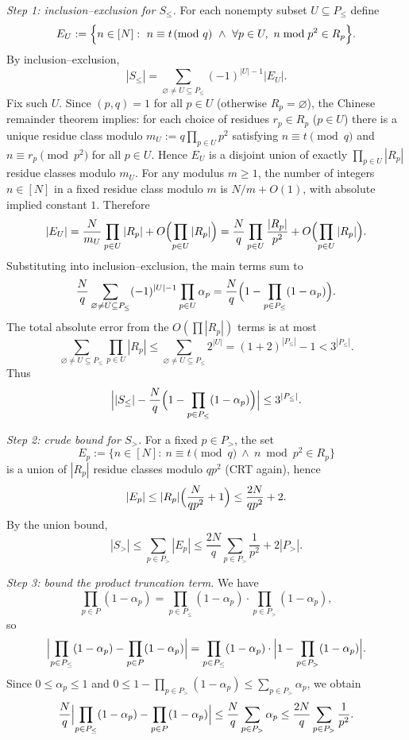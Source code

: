 \emph{Step 1: inclusion--exclusion for $S_{\le}$.}
For each nonempty subset $U\subseteq P_{\le}$ define
\[
E_U:=\Bigl\{n\in[N]:\ n\equiv t\!\!\pmod q\ \wedge\ \forall p\in U,\ n\bmod p^2\in R_p\Bigr\}.
\]
By inclusion--exclusion,
\[
|S_{\le}|=\sum_{\varnothing\ne U\subseteq P_{\le}}(-1)^{|U|-1}|E_U|.
\]
Fix such $U$. Since $(p,q)=1$ for all $p\in U$ (otherwise $R_p=\varnothing$), the Chinese remainder theorem implies:
for each choice of residues $r_p\in R_p$ ($p\in U$) there is a unique residue class modulo $m_U:=q\prod_{p\in U}p^2$
satisfying $n\equiv t\pmod q$ and $n\equiv r_p\pmod{p^2}$ for all $p\in U$.
Hence $E_U$ is a disjoint union of exactly $\prod_{p\in U}|R_p|$ residue classes modulo $m_U$.
For any modulus $m\ge 1$, the number of integers $n\in[N]$ in a fixed residue class modulo $m$ is $N/m+O(1)$, with absolute implied constant $1$.
Therefore
\[
|E_U|
=\frac{N}{m_U}\prod_{p\in U}|R_p|+O\Bigl(\prod_{p\in U}|R_p|\Bigr)
=\frac{N}{q}\prod_{p\in U}\frac{|R_p|}{p^2}+O\Bigl(\prod_{p\in U}|R_p|\Bigr).
\]
Substituting into inclusion--exclusion, the main terms sum to
\[
\frac{N}{q}\sum_{\varnothing\ne U\subseteq P_{\le}}(-1)^{|U|-1}\prod_{p\in U}\alpha_p
=\frac{N}{q}\Bigl(1-\prod_{p\in P_{\le}}(1-\alpha_p)\Bigr).
\]
The total absolute error from the $O(\prod|R_p|)$ terms is at most
\[
\sum_{\varnothing\ne U\subseteq P_{\le}}\prod_{p\in U}|R_p|
\le \sum_{\varnothing\ne U\subseteq P_{\le}}2^{|U|}
=(1+2)^{|P_{\le}|}-1<3^{|P_{\le}|}.
\]
Thus
\begin{equation}
\Bigl||S_{\le}|-\frac{N}{q}\Bigl(1-\prod_{p\in P_{\le}}(1-\alpha_p)\Bigr)\Bigr|
\le 3^{|P_{\le}|}.
\label{eq:err_Sle}
\end{equation}

\emph{Step 2: crude bound for $S_{>}$.}
For a fixed $p\in P_{>}$, the set
\[
E_p:=\{n\in[N]:\ n\equiv t\!\!\pmod q\ \wedge\ n\bmod p^2\in R_p\}
\]
is a union of $|R_p|$ residue classes modulo $qp^2$ (CRT again), hence
\[
|E_p|\le |R_p|\Bigl(\frac{N}{qp^2}+1\Bigr)\le \frac{2N}{qp^2}+2.
\]
By the union bound,
\begin{equation}
|S_{>}|\le \sum_{p\in P_{>}}|E_p|
\le \frac{2N}{q}\sum_{p\in P_{>}}\frac{1}{p^2}+2|P_{>}|.
\label{eq:err_Sgt}
\end{equation}

\emph{Step 3: bound the product truncation term.}
We have
\[
\prod_{p\in P}(1-\alpha_p)=\prod_{p\in P_{\le}}(1-\alpha_p)\cdot \prod_{p\in P_{>}}(1-\alpha_p),
\]
so
\[
\Bigl|\prod_{p\in P_{\le}}(1-\alpha_p)-\prod_{p\in P}(1-\alpha_p)\Bigr|
=\prod_{p\in P_{\le}}(1-\alpha_p)\cdot\Bigl|1-\prod_{p\in P_{>}}(1-\alpha_p)\Bigr|.
\]
Since $0\le \alpha_p\le 1$ and $0\le 1-\prod_{p\in P_{>}}(1-\alpha_p)\le \sum_{p\in P_{>}}\alpha_p$, we obtain
\begin{equation}
\frac{N}{q}\Bigl|\prod_{p\in P_{\le}}(1-\alpha_p)-\prod_{p\in P}(1-\alpha_p)\Bigr|
\le \frac{N}{q}\sum_{p\in P_{>}}\alpha_p
\le \frac{2N}{q}\sum_{p\in P_{>}}\frac{1}{p^2}.
\label{eq:err_prod}
\end{equation}

